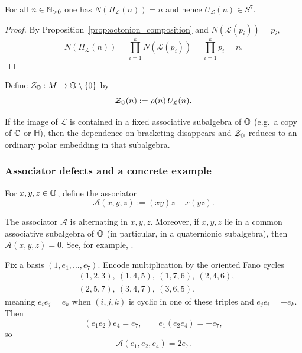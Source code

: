 \begin{proposition}
\label{prop:norm_consistency}
For all $n\in\mathbb{N}_{>0}$ one has $N(\Pi_{\mathcal{L}}(n))=n$ and hence $U_{\mathcal{L}}(n)\in S^7$.
\end{proposition}

\begin{proof}
By Proposition~\ref{prop:octonion_composition} and $N(\mathcal{L}(p_i))=p_i$,
$$
N(\Pi_{\mathcal{L}}(n)) = \prod_{i=1}^k N(\mathcal{L}(p_i)) = \prod_{i=1}^k p_i = n.
$$
\end{proof}

\begin{definition}
\label{def:Z_O_embedding}
Define $\mathcal{Z}_{\mathbb{O}}:M\to\mathbb{O}\setminus\{0\}$ by
$$
\mathcal{Z}_{\mathbb{O}}(n):=\rho(n)\,U_{\mathcal{L}}(n).
$$
\end{definition}

\begin{remark}
If the image of $\mathcal{L}$ is contained in a fixed associative subalgebra of $\mathbb{O}$ (e.g.\ a copy of $\mathbb{C}$ or $\mathbb{H}$), then the dependence on bracketing disappears and $\mathcal{Z}_{\mathbb{O}}$ reduces to an ordinary polar embedding in that subalgebra.
\end{remark}

\subsubsection{Associator defects and a concrete example}
\begin{definition}[Associator]
\label{def:associator}
For $x,y,z\in\mathbb{O}$, define the associator
$$
\mathcal{A}(x,y,z):=(xy)z-x(yz).
$$
\end{definition}

\begin{proposition}
\label{prop:associator_properties}
The associator $\mathcal{A}$ is alternating in $x,y,z$.
Moreover, if $x,y,z$ lie in a common associative subalgebra of $\mathbb{O}$ (in particular, in a quaternionic subalgebra), then $\mathcal{A}(x,y,z)=0$.
See, for example, \cite{Baez2002}.
\end{proposition}

\begin{remark}
\label{ex:associator_example}
Fix a basis $(1,e_1,\dots,e_7)$. Encode multiplication by the oriented Fano cycles
$$
\begin{aligned}
&(1,2,3),\ (1,4,5),\ (1,7,6),\ (2,4,6),\\
&(2,5,7),\ (3,4,7),\ (3,6,5).
\end{aligned}
$$
meaning $e_ie_j=e_k$ when $(i,j,k)$ is cyclic in one of these triples and $e_je_i=-e_k$.
Then
$$
(e_1e_2)e_4=e_7,\qquad e_1(e_2e_4)=-e_7,
$$
so
$$
\mathcal{A}(e_1,e_2,e_4)=2e_7.
$$
\end{remark}
